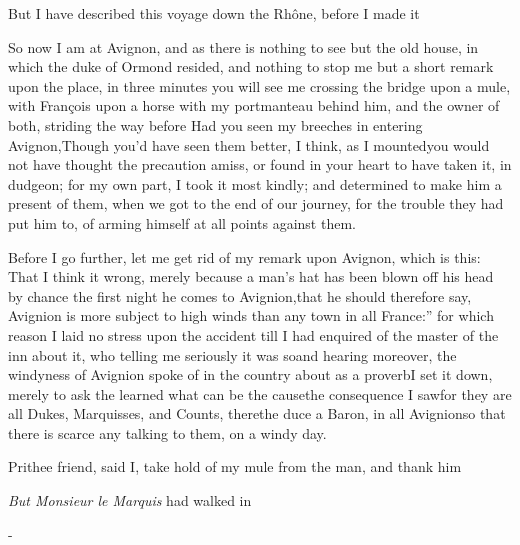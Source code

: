 \documentclass{article}
\begin{document}
But I have described this voyage down the Rhône,
before I made it\tsh

\tsh So now I am at Avignon, and as there is
nothing to see but the old house, in which the duke of
Ormond resided, and nothing to stop me but a short remark
upon the place, in three minutes you will see me crossing the
bridge upon a mule, with François upon a horse with
my portmanteau behind him, and the owner of both, striding the way
before 
Had you
seen my breeches in entering Avignon,\tsh Though
you’d have seen them better, I think, as I mounted\tsk you
would not have thought the precaution amiss, or found in your heart
to have taken it, in dudgeon; for my own part, I took it most
kindly; and determined to make him a present of them, when we got
to the end of our journey, for the trouble they had put him to, of
arming himself at all points against them.

Before I go further, let me get rid of my remark upon
Avignon, which is this: That I think it wrong, merely because a man’s
hat has been blown off his head by chance the first night he comes
to Avig\-nion,\tsh that he should therefore say,\break
\lqq Avignion is more subject to high winds than any town
in all France:” for which reason I laid no stress upon
the accident till I had enquired of the master of the inn about it,
who telling me seriously it was so\tsh and hearing
moreover, the windyness of Avignion spoke of in the country
about as a proverb\tsh I set it down, merely to ask the
learned what can be the cause\tsh the consequence I
saw\tsk for they are all Dukes, Marquisses, and Counts,
there\tsh the duce a Baron, in all
Avignion\tsh so that there is scarce any talking to
them, on a windy day.

Prithee friend, said I, take hold of my
mule from the man, and thank him\tsh

\tsh \textit{But Monsieur le Marquis} had\break
walked in\tsh

\vfill{}\eject
\null\kern-\baselineskip
\end{document}
